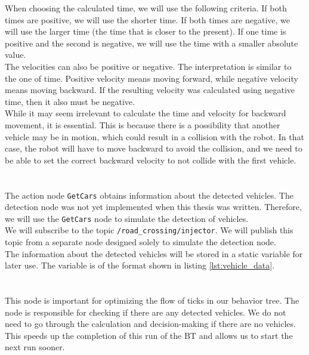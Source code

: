         When choosing the calculated time, we will use the following criteria. If both times are positive, we will use the shorter time. If both times are negative, we will use the larger time (the time that is closer to the present). If one time is positive and the second is negative, we will use the time with a smaller absolute value.\\
        The velocities can also be positive or negative. The interpretation is similar to the one of time. Positive velocity means moving forward, while negative velocity means moving backward. If the resulting velocity was calculated using negative time, then it also must be negative.\\
        While it may seem irrelevant to calculate the time and velocity for backward movement, it is essential. This is because there is a possibility that another vehicle may be in motion, which could result in a collision with the robot. In that case, the robot will have to move backward to avoid the collision, and we need to be able to set the correct backward velocity to not collide with the first vehicle.\\\\
    \\
        The action node \texttt{GetCars} obtains information about the detected vehicles. The detection node was not yet implemented when this thesis was written. Therefore, we will use the \texttt{GetCars} node to simulate the detection of vehicles.\\
        We will subscribe to the topic \texttt{/road\_crossing/injector}. We will publish this topic from a separate node designed solely to simulate the detection node.\\
        The information about the detected vehicles will be stored in a static variable for later use. The variable is of the format shown in listing \ref{lst:vehicle_data}.\\\\
    \\
        This node is important for optimizing the flow of ticks in our behavior tree. The node is responsible for checking if there are any detected vehicles. We do not need to go through the calculation and decision-making if there are no vehicles. This speeds up the completion of this run of the BT and allows us to start the next run sooner.\\\\
    \\
